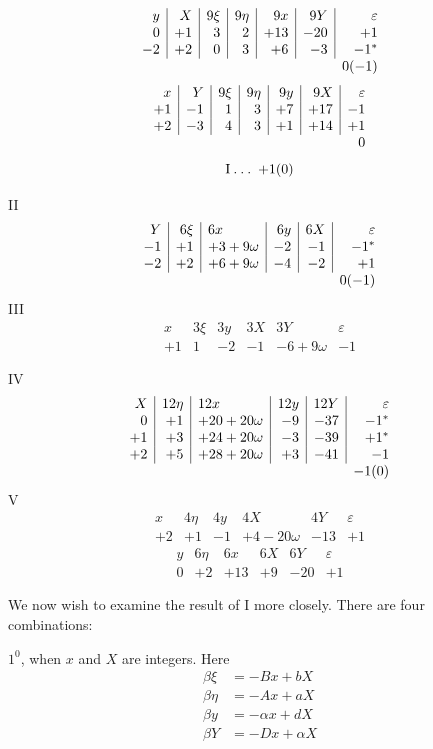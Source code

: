 \[
\begin{array}{r|r|r|r|r|r|r}
y&X&9\xi&9\eta&9x&9Y&\varepsilon\\
0&+1&3&2&+13&-20&+1\\
-2&+2&0&3&+6&-3&-1^{*}\\
\multicolumn{6}{c}{}&0(-1)
\end{array}
\]
\[
\begin{array}{r|r|r|r|r|r|r}
x&Y&9\xi&9\eta&9y&9X&\varepsilon\\
+1&-1&1&3&+7&+17&-1\\
+2&-3&4&3&+1&+14&+1\\
\multicolumn{6}{c}{}&0
\end{array}
\]
\[
\mathrm{I}\mathbin{.}\mathbin{.}\mathbin{.}\;+1(0)
\]

\noindent II
\[
\begin{array}{r|r|l|r|r|r}
Y&6\xi&6x&6y&6X&\varepsilon\\
-1&+1&+3+9\omega&-2&-1&-1^{*}\\
-2&+2&+6+9\omega&-4&-2&+1\\
\multicolumn{5}{c}{}&0(-1)
\end{array}
\]
\noindent III
\[
\begin{array}{r|r|r|r|l|r}
x&3\xi&3y&3X&3Y&\varepsilon\\
+1&1&-2&-1&-6+9\omega&-1
\end{array}
\]

\noindent IV
\[
\begin{array}{r|r|l|r|r|r}
X&12\eta&12x&12y&12Y&\varepsilon\\
0&+1&+20+20\omega&-9&-37&-1^{*}\\
+1&+3&+24+20\omega&-3&-39&+1^{*}\\
+2&+5&+28+20\omega&+3&-41&-1\\
\multicolumn{5}{c}{}&-1(0)
\end{array}
\]
\noindent V
\[
\begin{array}{r|r|r|l|r|r}
x&4\eta&4y&4X&4Y&\varepsilon\\
+2&+1&-1&+4-20\omega&-13&+1
\end{array}
\]
\[
\begin{array}{r|r|r|r|r|r}
y&6\eta&6x&6X&6Y&\varepsilon\\
0&+2&+13&+9&-20&+1
\end{array}
\]

We now wish to examine the result of I more closely. There are four combinations:\par
\noindent $1^0$, when $x$ and $X$ are integers. Here
\[
\begin{aligned}
\beta\xi&=-Bx+bX\\
\beta\eta&=-Ax+aX\\
\beta y&=-\alpha x+dX\\
\beta Y&=-Dx+\alpha X
\end{aligned}
\]

